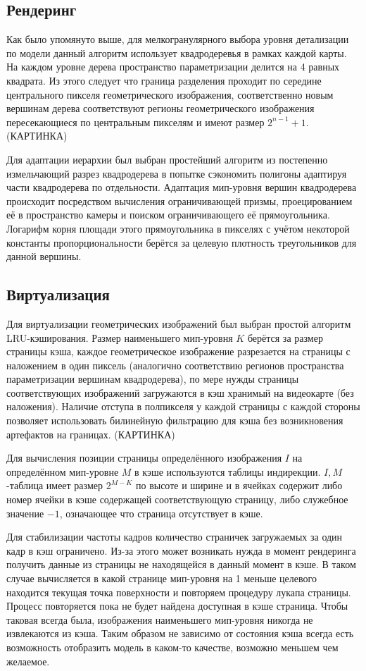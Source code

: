 \documentclass{article}
\begin{document}
\subsection{Рендеринг}
Как было упомянуто выше, для мелкогранулярного выбора уровня детализации по модели данный алгоритм использует квадродеревья в рамках каждой карты. На каждом уровне дерева пространство параметризации делится на 4 равных квадрата. Из этого следует что граница разделения проходит по середине центрального пикселя геометрического изображения, соответственно новым вершинам дерева соответствуют регионы геометрического изображения пересекающиеся по центральным пикселям и имеют размер $2^{n-1} + 1$. (КАРТИНКА)

Для адаптации иерархии был выбран простейший алгоритм из \cite{niski2007multi} постепенно измельчающий разрез квадродерева в попытке сэкономить полигоны адаптируя части квадродерева по отдельности. Адаптация мип-уровня вершин квадродерева происходит посредством вычисления ограничивающей призмы, проецированием её в пространство камеры и поиском ограничивающего её прямоугольника. Логарифм корня площади этого прямоугольника в пикселях с учётом некоторой константы пропорциональности берётся за целевую плотность треугольников для данной вершины.


\subsection{Виртуализация}
Для виртуализации геометрических изображений был выбран простой алгоритм LRU-кэширования. Размер наименьшего мип-уровня $K$ берётся за размер страницы кэша, каждое геометрическое изображение разрезается на страницы с наложением в один пиксель (аналогично соответствию регионов пространства параметризации вершинам квадродерева), по мере нужды страницы соответствующих изображений загружаются в кэш хранимый на видеокарте (без наложения). Наличие отступа в полпикселя у каждой страницы с каждой стороны позволяет использовать билинейную фильтрацию для кэша без возникновения артефактов на границах. (КАРТИНКА)

Для вычисления позиции страницы определённого изображения $I$ на определённом мип-уровне $M$ в кэше используются таблицы индирекции. $I,M$-таблица имеет размер $2^{M - K}$ по высоте и ширине и в ячейках содержит либо номер ячейки в кэше содержащей соответствующую страницу, либо служебное значение $-1$, означающее что страница отсутствует в кэше.

Для стабилизации частоты кадров количество страничек загружаемых за один кадр в кэш ограничено. Из-за этого может возникать нужда в момент рендеринга получить данные из страницы не находящейся в данный момент в кэше. В таком случае вычисляется в какой странице мип-уровня на 1 меньше целевого находится текущая точка поверхности и повторяем процедуру лукапа страницы. Процесс повторяется пока не будет найдена доступная в кэше страница. Чтобы таковая всегда была, изображения наименьшего мип-уровня никогда не извлекаются из кэша. Таким образом не зависимо от состояния кэша всегда есть возможность отобразить модель в каком-то качестве, возможно меньшем чем желаемое.
\end{document}
